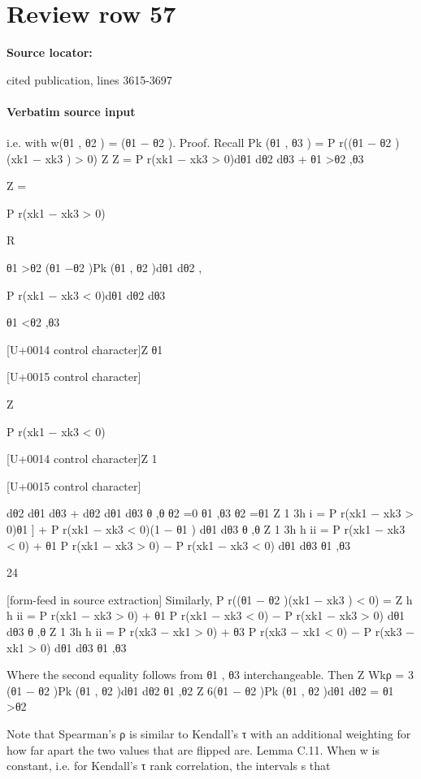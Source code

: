 \documentclass[10pt]{article}
\begin{document}
\section*{Review row 57}
\textbf{Source locator:} {\footnotesize\raggedright cited publication, lines 3615-\allowbreak{}3697\par}
\paragraph{Verbatim source input}
\begin{ReviewVerbatim}
i.e. with w(θ1 , θ2 ) = (θ1 − θ2 ).
Proof. Recall Pk (θ1 , θ3 ) =
P r((θ1 − θ2 )(xk1 − xk3 ) > 0)
Z
Z
=
P r(xk1 − xk3 > 0)dθ1 dθ2 dθ3 +
θ1 >θ2 ,θ3

Z
=

P r(xk1 − xk3 > 0)

R

θ1 >θ2 (θ1 −θ2 )Pk (θ1 , θ2 )dθ1 dθ2 ,

P r(xk1 − xk3 < 0)dθ1 dθ2 dθ3

θ1 <θ2 ,θ3

[U+0014 control character]Z θ1

[U+0015 control character]

Z

P r(xk1 − xk3 < 0)

[U+0014 control character]Z 1

[U+0015 control character]

dθ2 dθ1 dθ3 +
dθ2 dθ1 dθ3
θ ,θ
θ2 =0
θ1 ,θ3
θ2 =θ1
Z 1 3h
i
=
P r(xk1 − xk3 > 0)θ1 ] + P r(xk1 − xk3 < 0)(1 − θ1 ) dθ1 dθ3
θ ,θ
Z 1 3h
h
ii
=
P r(xk1 − xk3 < 0) + θ1 P r(xk1 − xk3 > 0) − P r(xk1 − xk3 < 0) dθ1 dθ3
θ1 ,θ3

24


[form-feed in source extraction]
Similarly,
P r((θ1 − θ2 )(xk1 − xk3 ) < 0) =
Z
h
h
ii
=
P r(xk1 − xk3 > 0) + θ1 P r(xk1 − xk3 < 0) − P r(xk1 − xk3 > 0) dθ1 dθ3
θ ,θ
Z 1 3h
h
ii
=
P r(xk3 − xk1 > 0) + θ3 P r(xk3 − xk1 < 0) − P r(xk3 − xk1 > 0) dθ1 dθ3
θ1 ,θ3

Where the second equality follows from θ1 , θ3 interchangeable. Then
Z
Wkρ = 3
(θ1 − θ2 )Pk (θ1 , θ2 )dθ1 dθ2
θ1 ,θ2
Z
6(θ1 − θ2 )Pk (θ1 , θ2 )dθ1 dθ2
=
θ1 >θ2

Note that Spearman’s ρ is similar to Kendall’s τ with an additional weighting for how far apart
the two values that are flipped are.
Lemma C.11. When w is constant, i.e. for Kendall’s τ rank correlation, the intervals s that
\end{ReviewVerbatim}
\end{document}
